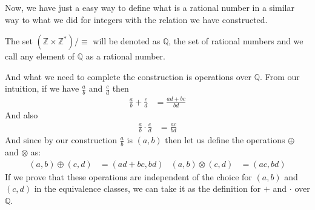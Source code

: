 \documentclass{tufte-handout}
\begin{document}
Now, we have just a easy way to define what is a rational number in a similar way to what we did for integers with the relation we have constructed.

\begin{definition}
	The set $(\mathbb{Z} \times \mathbb{Z}^*)/\equiv$ will be denoted as $\mathbb{Q}$, the set of rational numbers and we call any element of $\mathbb{Q}$ as a rational number.
\end{definition}

And what we need to complete the construction is operations over $\mathbb{Q}$. From our intuition, if we have $\frac{a}{b}$ and $\frac{c}{d}$ then
\begin{align*}
	\frac{a}{b} + \frac{c}{d} &= \frac{ad+bc}{bd}
\end{align*}
And also
\begin{align*}
	\frac{a}{b} \cdot \frac{c}{d} &= \frac{ac}{bd}
\end{align*}
And since by our construction $\frac{a}{b}$ is $(a, b)$ then let us define the operations $\oplus$ and $\otimes$ as:
\begin{align*}
	(a, b) \oplus (c, d) &= (ad+bc, bd) & (a, b) \otimes (c, d) &= (ac, bd)
\end{align*}
If we prove that these operations are independent of the choice for $(a, b)$ and $(c, d)$ in the equivalence classes, we can take it as the definition for $+$ and $\cdot$ over $\mathbb{Q}$.
\end{document}
